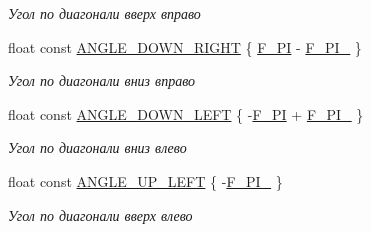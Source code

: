 \begin{Indent}
\begin{DoxyCompactItemize}
\begin{DoxyCompactList}\small\item\em Угол по диагонали вверх вправо \end{DoxyCompactList}\item 
\mbox{\label{namespacertm_a40df5f56b94a2220d7c699a5579fed3e}} 
float const \hyperlink{namespacertm_a40df5f56b94a2220d7c699a5579fed3e}{A\+N\+G\+L\+E\+\_\+\+D\+O\+W\+N\+\_\+\+R\+I\+G\+HT} \{ \hyperlink{namespacertm_ae15880ada663d5427ba0d78437ee5c26}{F\+\_\+\+PI} -\/ \hyperlink{namespacertm_a5d5e98851be43c6884812bf293b09184}{F\+\_\+\+P\+I\+\_} \}
\begin{DoxyCompactList}\small\item\em Угол по диагонали вниз вправо \end{DoxyCompactList}\item 
\mbox{\label{namespacertm_a4bed3c8feb0750037e813a56967b769f}} 
float const \hyperlink{namespacertm_a4bed3c8feb0750037e813a56967b769f}{A\+N\+G\+L\+E\+\_\+\+D\+O\+W\+N\+\_\+\+L\+E\+FT} \{ -\/\hyperlink{namespacertm_ae15880ada663d5427ba0d78437ee5c26}{F\+\_\+\+PI} + \hyperlink{namespacertm_a5d5e98851be43c6884812bf293b09184}{F\+\_\+\+P\+I\+\_} \}
\begin{DoxyCompactList}\small\item\em Угол по диагонали вниз влево \end{DoxyCompactList}\item 
\mbox{\label{namespacertm_a90a064b89a319fb6acb1792093efe73a}} 
float const \hyperlink{namespacertm_a90a064b89a319fb6acb1792093efe73a}{A\+N\+G\+L\+E\+\_\+\+U\+P\+\_\+\+L\+E\+FT} \{ -\/\hyperlink{namespacertm_a5d5e98851be43c6884812bf293b09184}{F\+\_\+\+P\+I\+\_} \}
\begin{DoxyCompactList}\small\item\em Угол по диагонали вверх влево \end{DoxyCompactList}\end{DoxyCompactItemize}
\end{Indent}
